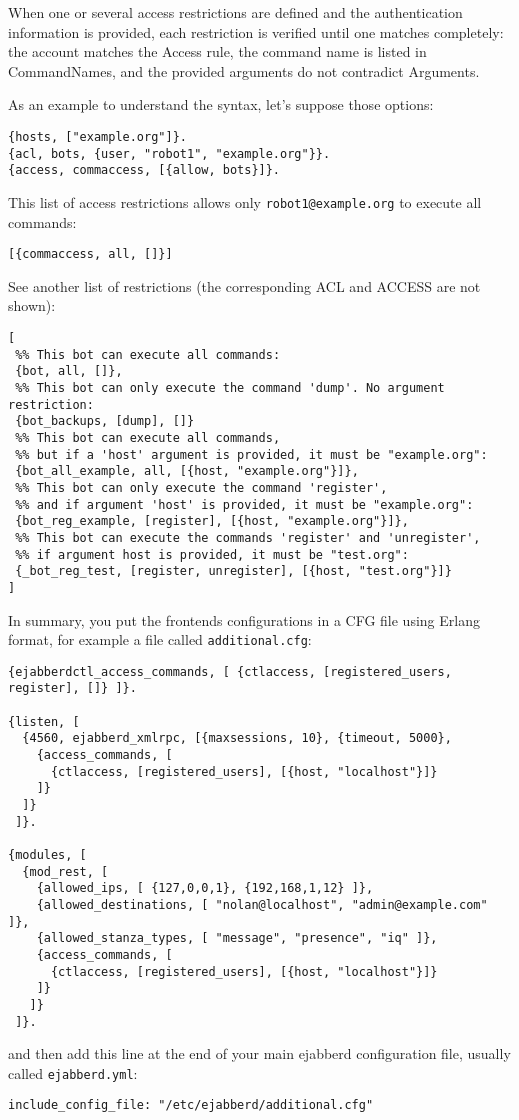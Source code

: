 \documentclass[a4paper,10pt]{book}
\newcommand{\term}[1]{\texttt{#1}}
\begin{document}
When one or several access restrictions are defined and the
authentication information is provided,
each restriction is verified until one matches completely:
the account matches the Access rule,
the command name is listed in CommandNames,
and the provided arguments do not contradict Arguments.

As an example to understand the syntax, let's suppose those options:
\begin{verbatim}
{hosts, ["example.org"]}.
{acl, bots, {user, "robot1", "example.org"}}.
{access, commaccess, [{allow, bots}]}.
\end{verbatim}

This list of access restrictions allows only \term{robot1@example.org} to execute all commands:
\begin{verbatim}
[{commaccess, all, []}]
\end{verbatim}

See another list of restrictions (the corresponding ACL and ACCESS are not shown):
\begin{verbatim}
[
 %% This bot can execute all commands:
 {bot, all, []},
 %% This bot can only execute the command 'dump'. No argument restriction:
 {bot_backups, [dump], []}
 %% This bot can execute all commands,
 %% but if a 'host' argument is provided, it must be "example.org":
 {bot_all_example, all, [{host, "example.org"}]},
 %% This bot can only execute the command 'register',
 %% and if argument 'host' is provided, it must be "example.org":
 {bot_reg_example, [register], [{host, "example.org"}]},
 %% This bot can execute the commands 'register' and 'unregister',
 %% if argument host is provided, it must be "test.org":
 {_bot_reg_test, [register, unregister], [{host, "test.org"}]}
]
\end{verbatim}

In summary, you put the frontends configurations in a CFG file using Erlang format, for example a file called \term{additional.cfg}:
\begin{verbatim}
{ejabberdctl_access_commands, [ {ctlaccess, [registered_users, register], []} ]}.

{listen, [
  {4560, ejabberd_xmlrpc, [{maxsessions, 10}, {timeout, 5000},
    {access_commands, [
      {ctlaccess, [registered_users], [{host, "localhost"}]}
    ]}
  ]}
 ]}.

{modules, [
  {mod_rest, [
    {allowed_ips, [ {127,0,0,1}, {192,168,1,12} ]},
    {allowed_destinations, [ "nolan@localhost", "admin@example.com" ]},
    {allowed_stanza_types, [ "message", "presence", "iq" ]},
    {access_commands, [
      {ctlaccess, [registered_users], [{host, "localhost"}]}
    ]}
   ]}
 ]}.
\end{verbatim}
and then add this line at the end of your main ejabberd configuration file, usually called \term{ejabberd.yml}:
\begin{verbatim}
include_config_file: "/etc/ejabberd/additional.cfg"
\end{verbatim}
\end{document}
